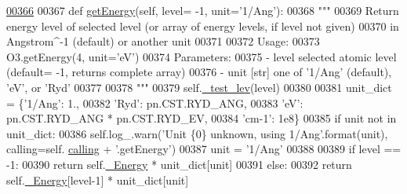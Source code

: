 \begin{DoxyCode}
\hypertarget{classpyneb_1_1utils_1_1pn__chianti_1_1___atom_chianti_l00366}{}\hyperlink{classpyneb_1_1utils_1_1pn__chianti_1_1___atom_chianti_adfaee032bacec747d8a1573968d0ebf1}{00366} 
00367     \textcolor{keyword}{def }\hyperlink{classpyneb_1_1utils_1_1pn__chianti_1_1___atom_chianti_adfaee032bacec747d8a1573968d0ebf1}{getEnergy}(self, level= -1, unit='1/Ang'):
00368         \textcolor{stringliteral}{"""}
00369 \textcolor{stringliteral}{        Return energy level of selected level (or array of energy levels, if level not given) }
00370 \textcolor{stringliteral}{            in Angstrom^-1 (default) or another unit}
00371 \textcolor{stringliteral}{        }
00372 \textcolor{stringliteral}{        Usage:}
00373 \textcolor{stringliteral}{            O3.getEnergy(4, unit='eV')}
00374 \textcolor{stringliteral}{        Parameters:}
00375 \textcolor{stringliteral}{            - level  selected atomic level (default= -1, returns complete array)}
00376 \textcolor{stringliteral}{            - unit   [str] one of '1/Ang' (default), 'eV', or 'Ryd'    }
00377 \textcolor{stringliteral}{            }
00378 \textcolor{stringliteral}{        """}
00379         self.\hyperlink{classpyneb_1_1utils_1_1pn__chianti_1_1___atom_chianti_a596a6602f53c54689316ee543e407c49}{\_test\_lev}(level)
00380 
00381         unit\_dict = \{\textcolor{stringliteral}{'1/Ang'}: 1.,
00382                      \textcolor{stringliteral}{'Ryd'}: pn.CST.RYD\_ANG,
00383                      \textcolor{stringliteral}{'eV'}: pn.CST.RYD\_ANG * pn.CST.RYD\_EV,
00384                      \textcolor{stringliteral}{'cm-1'}: 1e8\}
00385         \textcolor{keywordflow}{if} unit \textcolor{keywordflow}{not} \textcolor{keywordflow}{in} unit\_dict:
00386             self.log\_.warn(\textcolor{stringliteral}{'Unit \{0\} unknown, using 1/Ang'}.format(unit), calling=self.
      \hyperlink{classpyneb_1_1utils_1_1pn__chianti_1_1___atom_chianti_af0303fd3e5fd4db39d3d1cdf62b2e4bc}{calling} + \textcolor{stringliteral}{'.getEnergy'})
00387             unit = \textcolor{stringliteral}{'1/Ang'}        
00388         
00389         \textcolor{keywordflow}{if} level == -1:
00390             \textcolor{keywordflow}{return} self.\hyperlink{classpyneb_1_1utils_1_1pn__chianti_1_1___atom_chianti_a7c9c9c75a6bacb0f6533e870cf556035}{\_Energy} * unit\_dict[unit]
00391         \textcolor{keywordflow}{else}:
00392             \textcolor{keywordflow}{return} self.\hyperlink{classpyneb_1_1utils_1_1pn__chianti_1_1___atom_chianti_a7c9c9c75a6bacb0f6533e870cf556035}{\_Energy}[level-1] * unit\_dict[unit]
        
\end{DoxyCode}
